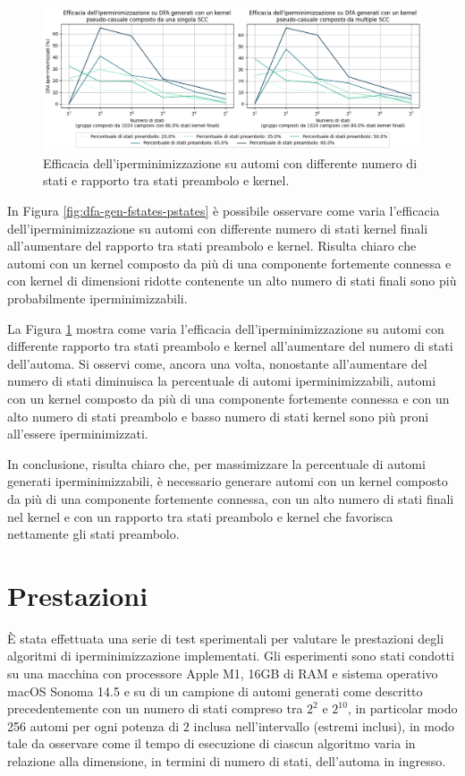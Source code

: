 \documentclass[a4paper,12pt]{report} %
\begin{document}
\begin{figure}[!htb]
  \centering
  \includegraphics[width=1\linewidth]{images/dfa_gen_pstates_nstates.png}
  \caption{\label{fig:dfa-gen-pstates-nstates}Efficacia dell'iperminimizzazione 
  su automi con differente numero di stati e rapporto tra stati preambolo e kernel.}
\end{figure}

In Figura \ref{fig:dfa-gen-fstates-pstates} è possibile osservare come varia l'efficacia dell'iperminimizzazione 
su automi con differente numero di stati kernel finali all'aumentare del rapporto tra stati preambolo e kernel.
Risulta chiaro che automi con un kernel composto da più di una componente fortemente connessa e con kernel di 
dimensioni ridotte contenente un alto numero di stati finali sono più probabilmente iperminimizzabili.

La Figura \ref{fig:dfa-gen-pstates-nstates} mostra come varia l'efficacia dell'iperminimizzazione 
su automi con differente rapporto tra stati preambolo e kernel all'aumentare del numero di stati dell'automa.
Si osservi come, ancora una volta, nonostante all'aumentare del numero di stati diminuisca la percentuale di automi
iperminimizzabili, automi con un kernel composto da più di una componente fortemente connessa e con un alto
numero di stati preambolo e basso numero di stati kernel sono più proni all'essere iperminimizzati.

In conclusione, risulta chiaro che, per massimizzare la percentuale di automi generati iperminimizzabili,
è necessario generare automi con un kernel composto da più di una componente fortemente connessa, con un alto
numero di stati finali nel kernel e con un rapporto tra stati preambolo e kernel che favorisca nettamente
gli stati preambolo.

\section{Prestazioni}

È stata effettuata una serie di test sperimentali per valutare le prestazioni degli algoritmi di iperminimizzazione
implementati. Gli esperimenti sono stati condotti su una macchina con processore Apple M1, 16GB di RAM e sistema
operativo macOS Sonoma 14.5 e su di un campione di automi generati come descritto precedentemente con un numero di
stati compreso tra $2^2$ e $2^{10}$, in particolar modo 256 automi per ogni potenza di $2$ inclusa nell'intervallo
(estremi inclusi), in modo tale da osservare come il tempo di esecuzione di ciascun algoritmo varia in relazione
alla dimensione, in termini di numero di stati, dell’automa in ingresso.
\end{document}
